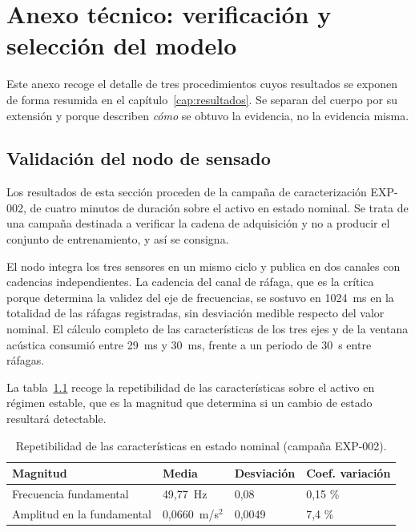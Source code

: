 \chapter{Anexo técnico: verificación y selección del modelo}
\label{anexo:verificacion}

Este anexo recoge el detalle de tres procedimientos cuyos resultados se exponen de forma
resumida en el capítulo~\ref{cap:resultados}. Se separan del cuerpo por su extensión y porque
describen \textit{cómo} se obtuvo la evidencia, no la evidencia misma.

\section{Validación del nodo de sensado}

Los resultados de esta sección proceden de la campaña de caracterización EXP-002, de cuatro
minutos de duración sobre el activo en estado nominal. Se trata de una campaña destinada a
verificar la cadena de adquisición y no a producir el conjunto de entrenamiento, y así se
consigna.

El nodo integra los tres sensores en un mismo ciclo y publica en dos canales con cadencias
independientes. La cadencia del canal de ráfaga, que es la crítica porque determina la validez
del eje de frecuencias, se sostuvo en \mbox{1024 ms} en la totalidad de las ráfagas
registradas, sin desviación medible respecto del valor nominal. El cálculo completo de las
características de los tres ejes y de la ventana acústica consumió entre \mbox{29 ms} y
\mbox{30 ms}, frente a un periodo de \mbox{30 s} entre ráfagas.

La tabla~\ref{table:validacion-nodo} recoge la repetibilidad de las características sobre el
activo en régimen estable, que es la magnitud que determina si un cambio de estado resultará
detectable.

\begin{table}[ht!]
\caption{Repetibilidad de las características en estado nominal (campaña EXP-002).}
\label{table:validacion-nodo}
\centering
\begin{tabular}{|p{4.6cm}|p{2.6cm}|p{2.2cm}|p{2.4cm}|}
\hline
\textbf{Magnitud} & \textbf{Media} & \textbf{Desviación} & \textbf{Coef. variación} \\
\hline
Frecuencia fundamental & \mbox{49,77 Hz} & 0,08 & 0,15 \% \\
\hline
Amplitud en la fundamental & \mbox{0,0660 m/s$^2$} & 0,0049 & 7,4 \% \\
\hline
\end{tabular}
\end{table}

